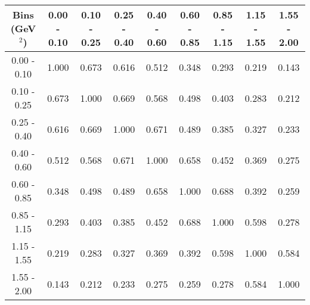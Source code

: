 \documentclass[aps, prd, reprint,showpacs,  preprintnumbers,amsmath,amssymb,superscriptaddress, nofootinbib]{revtex4-1}
\makeatletter
\renewenvironment{table}
  {\def\@captype{table}}
  {}
\makeatother
\begin{document}
\begin{table}
\centering
\begin{tabular}{ccccccccc}
\hline
Bins (GeV$^{2}$) &  0.00 - 0.10 &  0.10 - 0.25 &  0.25 - 0.40 &  0.40 - 0.60 &  0.60 - 0.85 &  0.85 - 1.15 &  1.15 - 1.55 &  1.55 - 2.00 \\ 
\hline
 0.00 -  0.10  & 1.000  & 0.673  & 0.616  & 0.512  & 0.348  & 0.293  & 0.219  & 0.143 \\
 0.10 -  0.25  & 0.673  & 1.000  & 0.669  & 0.568  & 0.498  & 0.403  & 0.283  & 0.212 \\
 0.25 -  0.40  & 0.616  & 0.669  & 1.000  & 0.671  & 0.489  & 0.385  & 0.327  & 0.233 \\
 0.40 -  0.60  & 0.512  & 0.568  & 0.671  & 1.000  & 0.658  & 0.452  & 0.369  & 0.275 \\
 0.60 -  0.85  & 0.348  & 0.498  & 0.489  & 0.658  & 1.000  & 0.688  & 0.392  & 0.259 \\
 0.85 -  1.15  & 0.293  & 0.403  & 0.385  & 0.452  & 0.688  & 1.000  & 0.598  & 0.278 \\
 1.15 -  1.55  & 0.219  & 0.283  & 0.327  & 0.369  & 0.392  & 0.598  & 1.000  & 0.584 \\
 1.55 -  2.00  & 0.143  & 0.212  & 0.233  & 0.275  & 0.259  & 0.278  & 0.584  & 1.000 \\
\hline
\hline
\end{tabular}
\caption{Correlation matrix for bins of $d\sigma/dQ^2$.}
\label{tb:piz-Q2-cov}
\end{table}

\vspace{0.3cm}


\vspace{0.3cm}
\end{document}
